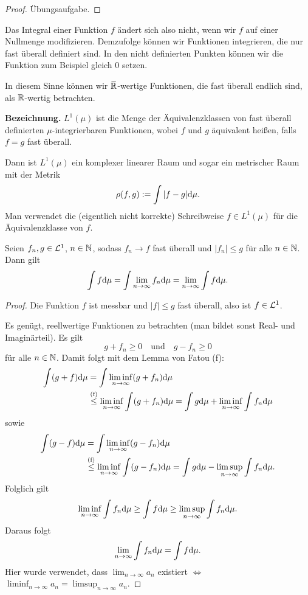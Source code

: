 \begin{proof}
 Übungsaufgabe.
\end{proof}

\begin{rmrk}
 Das Integral einer Funktion $f$ ändert sich also nicht, wenn wir $f$ auf einer Nullmenge modifizieren. Demzufolge können wir Funktionen integrieren, die nur fast überall definiert sind. In den nicht definierten Punkten können wir die Funktion zum Beispiel gleich 0 setzen.
 
 In diesem Sinne können wir $\realext$-wertige Funktionen, die fast überall endlich sind, als $\mathbb{R}$-wertig betrachten.
\end{rmrk}

\textbf{Bezeichnung.} 
$L^1(\mu)$ ist die Menge der Äquivalenzklassen von fast überall definierten $\mu$-integrierbaren Funktionen, wobei $f$ und $g$ äquivalent heißen, falls $f = g$ fast überall.

Dann ist $L^1(\mu)$ ein komplexer linearer Raum und sogar ein metrischer Raum mit der Metrik
\[ \rho( f,g ) := \int | f -g | \mathrm{d} \mu. \]
Man verwendet die (eigentlich nicht korrekte) Schreibweise $f \in L^1(\mu)$ für die Äqui\-valenz\-klasse von $f$.

\begin{thm}
 Seien $f_n, g \in \mathcal{L}^1$, $n \in \mathbb{N}$, sodass $f_n \to f$ fast überall und $|f_n| \le g$ für alle $n \in \mathbb{N}$. Dann gilt
 \[ \int f \mathrm{d} \mu = \int \lim_{n \to \infty} f_n \mathrm{d} \mu = \lim_{n \to \infty} \int f \mathrm{d} \mu. \]
\end{thm}

\begin{proof}
 Die Funktion $f$ ist messbar und $|f| \le g$ fast überall, also ist $f \in \mathcal{L}^1$. 
 
 Es genügt, reellwertige Funktionen zu betrachten (man bildet sonst Real- und Imaginärteil). Es gilt
 \[ g + f_n \ge 0 \quad \text{und} \quad g - f_n \ge 0 \]
 für alle $n \in \mathbb{N}$. Damit folgt mit dem Lemma von Fatou (f):
 \[ \begin{aligned}
  \int(g+f) \mathrm{d} \mu &= \int \liminf_{n \to \infty} (g + f_n) \mathrm{d} \mu \\
  &\overset{(\text{f})}{\le} \liminf_{n \to \infty} \int (g+f_n) \mathrm{d} \mu = \int g \mathrm{d} \mu + \liminf_{n \to \infty} \int f_n \mathrm{d} \mu 
    \end{aligned} \]
  sowie
 \[ \begin{aligned}
 \int(g-f) \mathrm{d} \mu &= \int \liminf_{n \to \infty} (g - f_n) \mathrm{d} \mu \\
  &\overset{(\text{f})}{\le} \liminf_{n \to \infty} \int(g - f_n) \mathrm{d} \mu = \int g \mathrm{d} \mu - \limsup_{n \to \infty} \int f_n \mathrm{d} \mu.
    \end{aligned} \]
 Folglich gilt
 \[ \liminf_{n \to \infty} \int f_n \mathrm{d} \mu \ge \int f \mathrm{d} \mu \ge \limsup_{n \to \infty} \int f_n \mathrm{d} \mu. \]
 Daraus folgt
 \[ \lim_{n \to \infty} \int f_n \mathrm{d} \mu = \int f \mathrm{d} \mu. \]
 Hier wurde verwendet, dass $\lim_{n \to \infty} a_n$ existiert $\Leftrightarrow$ $\liminf_{n \to \infty} a_n = \limsup_{n \to \infty} a_n$.
\end{proof}

